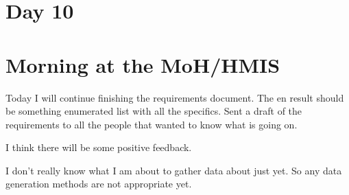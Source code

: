 \section{Day 10}
\section{Morning at the MoH/HMIS}
Today I will continue finishing the requirements document.
The en result should be something enumerated list with all the specifics.
Sent a draft of the requirements to all the people that wanted to know what is going on.

I think there will be some positive feedback.

I don't really know what I am about to gather data about just yet.
So any data generation methods are not appropriate yet.